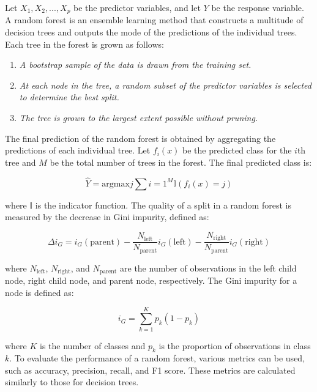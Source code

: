 \documentclass{article}[12pt]
\theoremstyle{definition}
\begin{document}
\newpage

\bigskip

\noindent
Let $X_1, X_2, ..., X_p$ be the predictor variables, and let $Y$ be the response variable. A random forest is an ensemble learning method that constructs a multitude of decision trees and outputs the mode of the predictions of the individual trees. Each tree in the forest is grown as follows:

\bigskip

\begin{enumerate}
\item  \textit{A bootstrap sample of the data is drawn from the training set.}
\item \textit{At each node in the tree, a random subset of the predictor variables is selected to determine the best split.}
\item \textit{The tree is grown to the largest extent possible without pruning.}
\end{enumerate}

\bigskip

\noindent
The final prediction of the random forest is obtained by aggregating the predictions of each individual tree. Let $f_i(x)$ be the predicted class for the $i$th tree and $M$ be the total number of trees in the forest. The final predicted class is:

$$\hat{Y} = \text{argmax}j \sum{i=1}^{M} \mathbb{I}(f_i(x) = j)$$

\noindent
 where $\mathbb{I}$ is the indicator function. The quality of a split in a random forest is measured by the decrease in Gini impurity, defined as:

 $$\Delta i_{G} = i_G(\text{parent}) - \frac{N_{\text{left}}}{N_{\text{parent}}} i_G(\text{left}) - \frac{N_{\text{right}}}{N_{\text{parent}}} i_G(\text{right})$$

\noindent
where $N_{\text{left}}$, $N_{\text{right}}$, and $N_{\text{parent}}$ are the number of observations in the left child node, right child node, and parent node, respectively. The Gini impurity for a node is defined as:

$$i_G = \sum_{k=1}^{K} p_k (1 - p_k)$$

\noindent
where $K$ is the number of classes and $p_k$ is the proportion of observations in class $k$. To evaluate the performance of a random forest, various metrics can be used, such as accuracy, precision, recall, and F1 score. These metrics are calculated similarly to those for decision trees.
\end{document}
